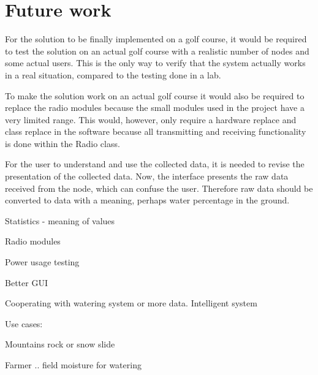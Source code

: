 \section{Future work}
For the solution to be finally implemented on a golf course, it would be required to test the solution on an actual golf course with a realistic number of nodes and some actual users. This is the only way to verify that the system actually works in a real situation, compared to the testing done in a lab.

To make the solution work on an actual golf course it would also be required to replace the radio modules because the small modules used in the project have a very limited range. This would, however, only require a hardware replace and class replace in the software because all transmitting and receiving functionality is done within the Radio class.

For the user to understand and use the collected data, it is needed to revise the presentation of the collected data. Now, the interface presents the raw data received from the node, which can confuse the user. Therefore raw data should be converted to data with a meaning, perhaps water percentage in the ground.

Statistics
 - meaning of values

Radio modules

Power usage testing

Better GUI

Cooperating with watering system or more data. Intelligent system


Use cases:

Mountains rock or snow slide

Farmer .. field moisture for watering

